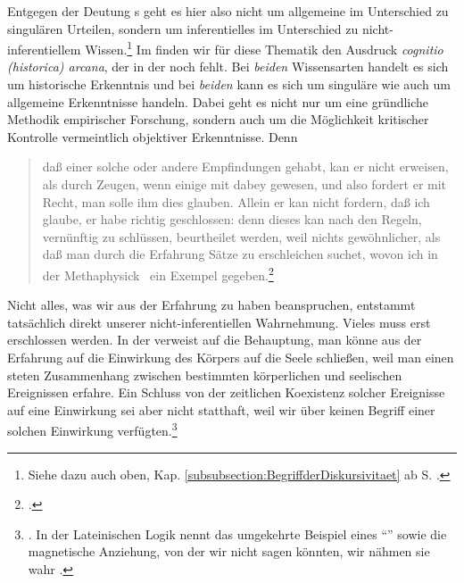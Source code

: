 Entgegen der Deutung s geht es
hier also nicht um allgemeine im Unterschied zu singulären Urteilen, sondern um
inferentielles im Unterschied zu nicht-inferentiellem Wissen.\footnote{Siehe
dazu auch oben, Kap. \ref{subsubsection:BegriffderDiskursivitaet} ab S.
\pageref{Abschnitt:judiciumintuitivumdiscursivum}.} Im  finden wir für diese Thematik den Ausdruck \emph{cognitio
(historica) arcana}, der in der  noch fehlt. Bei
\emph{beiden} Wissensarten handelt es sich um historische Erkenntnis und bei
\emph{beiden} kann es sich um singuläre wie auch um allgemeine Erkenntnisse
handeln. Dabei geht es nicht nur um eine gründliche Methodik empirischer
Forschung, sondern auch um die Möglichkeit kritischer Kontrolle vermeintlich
objektiver Erkenntnisse. Denn
\begin{quote}
 daß einer solche oder andere Empfindungen gehabt, kan er nicht erweisen, als
durch Zeugen, wenn einige mit dabey gewesen, und also fordert er mit Recht, man
solle ihm dies glauben. Allein er kan nicht fordern, daß ich glaube, er habe
richtig geschlossen: denn dieses kan nach den Regeln, vernünftig zu schlüssen,
beurtheilet werden, weil nichts gewöhnlicher, als daß man durch die Erfahrung
Sätze zu erschleichen suchet, wovon ich in der Methaphysick \punkt\ ein Exempel
gegeben.\footnote{\Cite[][Capitel 5, \S~4]{Wolff:VernuenftigeGedankenvondenKraeftendesmenschlichenVerstandesundihremrichtigenGebraucheinErkenntnisderWahrheit1978}.}
\end{quote}
Nicht alles, was wir aus der Erfahrung zu haben beanspruchen, entstammt
tatsächlich direkt unserer nicht-inferentiellen Wahrnehmung. Vieles muss erst
erschlossen werden. In der  verweist
 auf die Behauptung, man könne aus der
Erfahrung auf die Einwirkung des Körpers auf die Seele schließen, weil man einen
steten Zusammenhang zwischen bestimmten körperlichen und seelischen Ereignissen
erfahre. Ein Schluss von der zeitlichen Koexistenz solcher Ereignisse auf eine
Einwirkung sei aber nicht statthaft, weil wir über keinen Begriff einer solchen
Einwirkung
verfügten.\footnote{\cite[Vgl.][529]{Wolff:VernuenftigeGedankenvondenKraeftendesmenschlichenVerstandesundihremrichtigenGebraucheinErkenntnisderWahrheit1978}.
In der Lateinischen Logik nennt
 das umgekehrte
Beispiel eines \enquote{} sowie die
magnetische Anziehung, von der wir nicht sagen könnten, wir nähmen sie wahr
\parencite[vgl.][\S~667]{Wolff:PhilosophiarationalissiveLogica1740}.}

